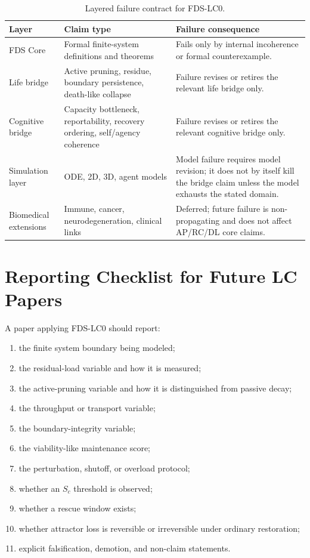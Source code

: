 \documentclass[10pt,a4paper,twocolumn,aps,prl]{revtex4-2}
\theoremstyle{claimstyle}
\theoremstyle{definition}
\newcommand{\FDS}{FDS}
\newcommand{\LC}{FDS-LC0}
\begin{document}
\begin{table}[t]
\centering
\small
\renewcommand{\arraystretch}{1.3}
\begin{tabular}{lll}
\toprule
\textbf{Layer} & \textbf{Claim type} & \textbf{Failure consequence} \\
\midrule
\FDS{} Core & \parbox[t]{4.5cm}{\raggedright Formal finite-system definitions and theorems} & \parbox[t]{7.5cm}{\raggedright Fails only by internal incoherence or formal counterexample.} \\
Life bridge & \parbox[t]{4.5cm}{\raggedright Active pruning, residue, boundary persistence, death-like collapse} & \parbox[t]{7.5cm}{\raggedright Failure revises or retires the relevant life bridge only.} \\
Cognitive bridge & \parbox[t]{4.5cm}{\raggedright Capacity bottleneck, reportability, recovery ordering, self/agency coherence} & \parbox[t]{7.5cm}{\raggedright Failure revises or retires the relevant cognitive bridge only.} \\
Simulation layer & \parbox[t]{4.5cm}{\raggedright ODE, 2D, 3D, agent models} & \parbox[t]{7.5cm}{\raggedright Model failure requires model revision; it does not by itself kill the bridge claim unless the model exhausts the stated domain.} \\
Biomedical extensions & \parbox[t]{4.5cm}{\raggedright Immune, cancer, neurodegeneration, clinical links} & \parbox[t]{7.5cm}{\raggedright Deferred; future failure is non-propagating and does not affect AP/RC/DL core claims.} \\
\bottomrule
\end{tabular}
\caption{Layered failure contract for \LC.}
\end{table}

\section{Reporting Checklist for Future LC Papers}

A paper applying \LC{} should report:
\begin{enumerate}
    \item the finite system boundary being modeled;
    \item the residual-load variable and how it is measured;
    \item the active-pruning variable and how it is distinguished from passive decay;
    \item the throughput or transport variable;
    \item the boundary-integrity variable;
    \item the viability-like maintenance score;
    \item the perturbation, shutoff, or overload protocol;
    \item whether an $S_c$ threshold is observed;
    \item whether a rescue window exists;
    \item whether attractor loss is reversible or irreversible under ordinary restoration;
    \item explicit falsification, demotion, and non-claim statements.
\end{enumerate}
\end{document}
